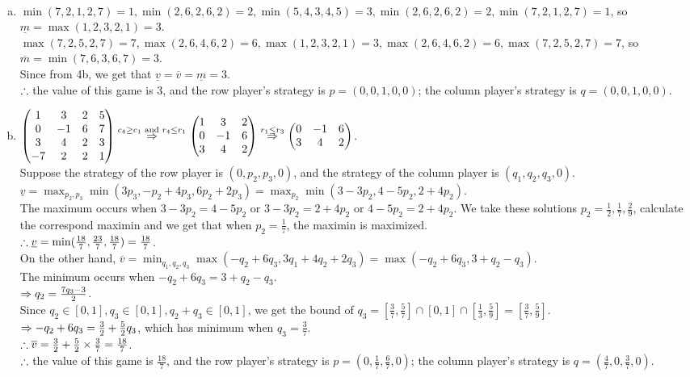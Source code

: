 \begin{pr}[7.11.24]$ $
\begin{enumerate}[(a)]
\item $\min(7, 2, 1, 2, 7)=1, \min(2, 6, 2, 6, 2)=2, \min(5, 4, 3, 4, 5)=3, \min(2, 6, 2, 6, 2)=2, \min(7, 2, 1, 2, 7)=1$, so $\underline{m}=\max(1, 2, 3, 2, 1)=3$.\\
$\max(7, 2, 5, 2, 7)=7, \max(2, 6, 4, 6, 2)=6, \max(1, 2, 3, 2, 1)=3, \max(2, 6, 4, 6, 2)=6, \max(7, 2, 5, 2, 7)=7$, so $\overline{m}=\min(7, 6, 3, 6, 7)=3$.\\
Since from 4b, we get that $\underline{v}=\overline{v}=\underline{m}=3$.\\
$\therefore$ the value of this game is $3$, and the row player's strategy is $p=(0, 0, 1, 0, 0)$; the column player's strategy is $q=(0, 0, 1, 0, 0)$.
\item $\begin{pmatrix}1&3&2&5\\0&-1&6&7\\3&4&2&3\\-7&2&2&1\end{pmatrix}\overset{c_4\geq c_1\text{ and }r_4\leq r_1}{\Rightarrow}\begin{pmatrix}1&3&2\\0&-1&6\\3&4&2\end{pmatrix}\overset{r_1\leq r_3}{\Rightarrow}\begin{pmatrix}0&-1&6\\3&4&2\end{pmatrix}$.\\
Suppose the strategy of the row player is $(0, p_2, p_3, 0)$, and the strategy of the column player is $(q_1, q_2, q_3, 0)$.\\
$\underline{v}=\max_{p_2, p_3}\min(3p_3, -p_2+4p_3, 6p_2+2p_3)=\max_{p_2}\min(3-3p_2, 4-5p_2, 2+4p_2)$.\\
The maximum occurs when $3-3p_2=4-5p_2$ or $3-3p_2=2+4p_2$ or $4-5p_2=2+4p_2$. We take these solutions $p_2=\frac12, \frac17, \frac29$, calculate the correspond maximin and we get that when $p_2=\frac17$, the maximin is maximized.\\
$\therefore\underline{v}=\min(\frac{18}7, \frac{23}7, \frac{18}7)=\frac{18}7$.\\
On the other hand, $\overline{v}=\min_{q_1, q_2, q_3}\max(-q_2+6q_3, 3q_1+4q_2+2q_3)=\max(-q_2+6q_3, 3+q_2-q_3)$.\\
The minimum occurs when $-q_2+6q_3=3+q_2-q_3$.\\
$\Rightarrow q_2=\frac{7q_3-3}2$.\\
Since $q_2\in[0, 1], q_3\in[0, 1], q_2+q_3\in[0, 1]$, we get the bound of $q_3=[\frac37, \frac57]\cap[0, 1]\cap[\frac13, \frac59]=[\frac37, \frac59]$.\\
$\Rightarrow-q_2+6q_3=\frac32+\frac52q_3$, which has minimum when $q_3=\frac37$.\\
$\therefore\overline{v}=\frac32+\frac52\times\frac37=\frac{18}7$.\\
$\therefore$ the value of this game is $\frac{18}7$, and the row player's strategy is $p=(0, \frac17, \frac67, 0)$; the column player's strategy is $q=(\frac47, 0, \frac37, 0)$.
\end{enumerate}
\end{pr}
